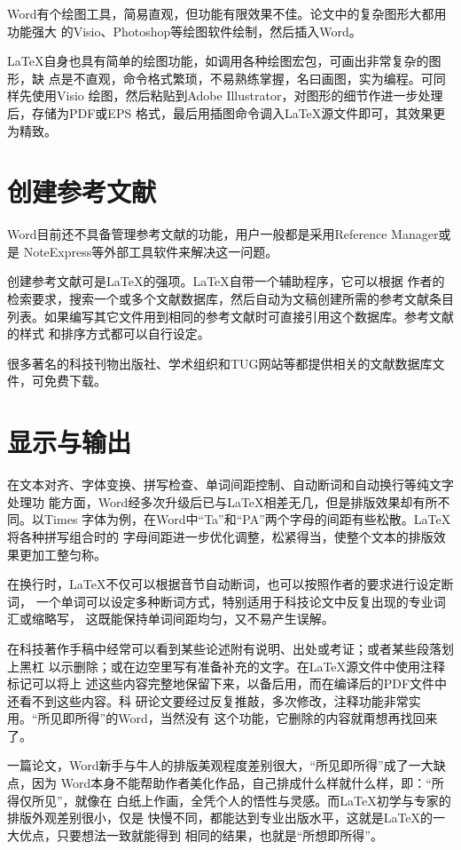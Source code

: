 Word有个绘图工具，简易直观，但功能有限效果不佳。论文中的复杂图形大都用功能强大
的Visio、Photoshop等绘图软件绘制，然后插入Word。

\LaTeX{}自身也具有简单的绘图功能，如调用各种绘图宏包，可画出非常复杂的图形，缺
点是不直观，命令格式繁琐，不易熟练掌握，名曰画图，实为编程。可同样先使用Visio
绘图，然后粘贴到Adobe Illustrator，对图形的细节作进一步处理后，存储为PDF或EPS
格式，最后用插图命令调入\LaTeX{}源文件即可，其效果更为精致。

\section*{创建参考文献}

Word目前还不具备管理参考文献的功能，用户一般都是采用Reference Manager或是
NoteExpress等外部工具软件来解决这一问题。

创建参考文献可是\LaTeX{}的强项。\LaTeX{}自带一个辅助程序\BibTeX{}，它可以根据
作者的检索要求，搜索一个或多个文献数据库，然后自动为文稿创建所需的参考文献条目
列表。如果编写其它文件用到相同的参考文献时可直接引用这个数据库。参考文献的样式
和排序方式都可以自行设定。

很多著名的科技刊物出版社、学术组织和TUG网站等都提供相关的\BibTeX{}文献数据库文
件，可免费下载。

\section*{显示与输出}

在文本对齐、字体变换、拼写检查、单词间距控制、自动断词和自动换行等纯文字处理功
能方面，Word经多次升级后已与\LaTeX{}相差无几，但是排版效果却有所不同。以Times
字体为例，在Word中“Ta”和“PA”两个字母的间距有些松散。\LaTeX{}将各种拼写组合时的
字母间距进一步优化调整，松紧得当，使整个文本的排版效果更加工整匀称。

在换行时，\LaTeX{}不仅可以根据音节自动断词，也可以按照作者的要求进行设定断词，
一个单词可以设定多种断词方式，特别适用于科技论文中反复出现的专业词汇或缩略写，
这既能保持单词间距均匀，又不易产生误解。

在科技著作手稿中经常可以看到某些论述附有说明、出处或考证；或者某些段落划上黑杠
以示删除；或在边空里写有准备补充的文字。在\LaTeX{}源文件中使用注释标记可以将上
述这些内容完整地保留下来，以备后用，而在编译后的PDF文件中还看不到这些内容。科
研论文要经过反复推敲，多次修改，注释功能非常实用。“所见即所得”的Word，当然没有
这个功能，它删除的内容就甭想再找回来了。

一篇论文，Word新手与牛人的排版美观程度差别很大，“所见即所得”成了一大缺点，因为
Word本身不能帮助作者美化作品，自己排成什么样就什么样，即：“所得仅所见”，就像在
白纸上作画，全凭个人的悟性与灵感。而\LaTeX{}初学与专家的排版外观差别很小，仅是
快慢不同，都能达到专业出版水平，这就是\LaTeX{}的一大优点，只要想法一致就能得到
相同的结果，也就是“所想即所得”。

